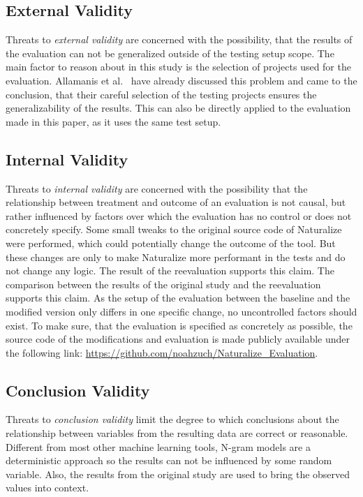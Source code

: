 \subsection{External Validity}
Threats to \emph{external validity} are concerned with the possibility, that the results of the evaluation can not be generalized outside of the testing setup scope. The main factor to reason about in this study is the selection of projects used for the evaluation. Allamanis et al.~\cite{naturalize} have already discussed this problem and came to the conclusion, that their careful selection of the testing projects ensures the generalizability of the results. This can also be directly applied to the evaluation made in this paper, as it uses the same test setup.

\subsection{Internal Validity}
Threats to \emph{internal validity} are concerned with the possibility that the relationship between treatment and outcome of an evaluation is not causal, but rather influenced by factors over which the evaluation has no control or does not concretely specify. Some small tweaks to the original source code of Naturalize were performed, which could potentially change the outcome of the tool. But these changes are only to make Naturalize more performant in the tests and do not change any logic. The result of the reevaluation supports this claim. The comparison between the results of the original study and the reevaluation supports this claim.
As the setup of the evaluation between the baseline and the modified version only differs in one specific change, no uncontrolled factors should exist. To make sure, that the evaluation is specified as concretely as possible, the source code of the modifications and evaluation is made publicly available under the following link: \url{https://github.com/noahzuch/Naturalize_Evaluation}.

\subsection{Conclusion Validity}
Threats to \emph{conclusion validity} limit the degree to which conclusions about the relationship between variables from the resulting data are correct or reasonable. Different from most other machine learning tools, N-gram models are a deterministic approach so the results can not be influenced by some random variable. Also, the results from the original study are used to bring the observed values into context.